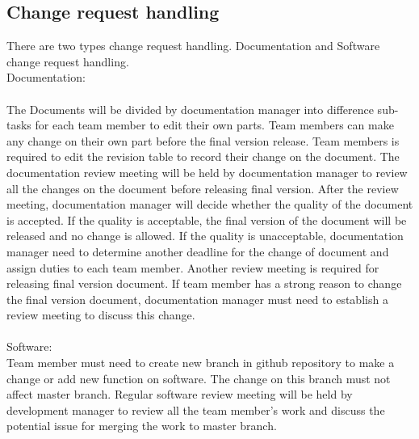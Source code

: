 \subsection{Change request handling}
There are two types change request handling. Documentation and Software change request handling.\\
Documentation:\\\\
The Documents will be divided by documentation manager into difference sub-tasks for each team member to edit their own parts. Team members can make any change on their own part before the final version release. Team members is required to edit the revision table to record their change on the document. The documentation review meeting will be held by documentation manager to review all the changes on the document before releasing final version. After the review meeting, documentation manager will decide whether the quality of the document is accepted. If the quality is acceptable, the final version of the document will be released and no change is allowed. If the quality is unacceptable, documentation manager need to determine another deadline for the change of document and assign duties to each team member. Another review meeting is required for releasing final version document.
If team member has a strong reason to change the final version document, documentation manager must need to establish a review meeting to discuss this change.\\\\
Software:\\
Team member must need to create new branch in github repository to make a change or add new function on software. The change on this branch must not affect master branch. Regular software review meeting will be held by development manager to review all the team member’s work and discuss the potential issue for merging the work to master branch. \\\\